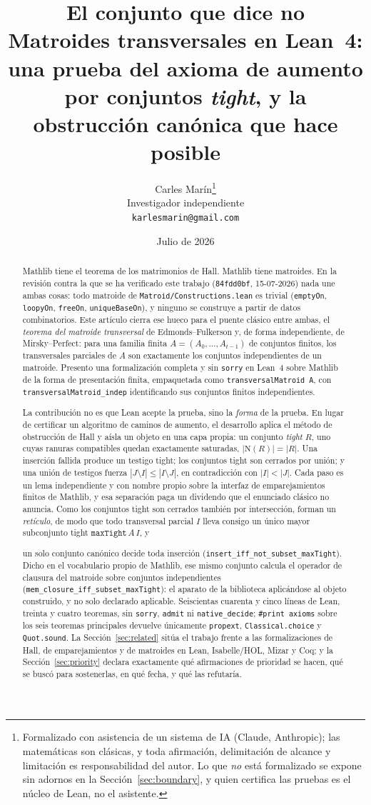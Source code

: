 \documentclass[11pt]{article}
\title{\bf El conjunto que dice no\\[4pt]
  \large\normalfont Matroides transversales en Lean~4: una prueba del axioma de aumento
  por conjuntos \emph{tight}, y la obstrucción canónica que hace posible}
\author{Carles Mar\'in\thanks{Formalizado con asistencia de un sistema de IA (Claude,
Anthropic); las matemáticas son clásicas, y toda afirmación, delimitación de alcance y
limitación es responsabilidad del autor. Lo que \emph{no} está formalizado se expone sin
adornos en la Sección~\ref{sec:boundary}, y quien certifica las pruebas es el núcleo de
Lean, no el asistente.}\\[3pt]
  \normalsize Investigador independiente\\
  \normalsize \texttt{karlesmarin@gmail.com}}
\date{Julio de 2026}
\newcommand{\lean}[1]{\texttt{#1}}
\newcommand{\N}{\mathrm{N}}
\newcommand{\keyeq}[1]{\begin{center}\keybox{$\displaystyle #1$}\end{center}}
\begin{document}
\maketitle

\begin{abstract}
Mathlib tiene el teorema de los matrimonios de Hall. Mathlib tiene matroides. En la revisión
contra la que se ha verificado este trabajo (\lean{84fdd0bf}, 15-07-2026) nada une ambas cosas:
todo matroide de \lean{Matroid/Constructions.lean} es trivial (\lean{emptyOn}, \lean{loopyOn},
\lean{freeOn}, \lean{uniqueBaseOn}), y ninguno se construye a partir de datos combinatorios. Este
artículo cierra ese hueco para el puente clásico entre ambas, el \emph{teorema del matroide
transversal} de Edmonds--Fulkerson y, de forma independiente, de Mirsky--Perfect: para una familia
finita $A=(A_0,\dots,A_{t-1})$ de conjuntos finitos, los transversales parciales de $A$ son
exactamente los conjuntos independientes de un matroide. Presento una formalización completa y sin
\lean{sorry} en Lean~4 sobre Mathlib de la forma de presentación finita, empaquetada como
\lean{transversalMatroid A}, con \lean{transversalMatroid\_indep} identificando sus conjuntos
finitos independientes.

La contribución no es que Lean acepte la prueba, sino la \emph{forma} de la prueba. En lugar de
certificar un algoritmo de caminos de aumento, el desarrollo aplica el método de obstrucción de
Hall y aísla un objeto en una capa propia: un conjunto \emph{tight} $R$, uno cuyas ranuras
compatibles quedan exactamente saturadas, $|\N(R)|=|R|$. Una inserción fallida produce un testigo
tight; los conjuntos tight son cerrados por unión; y una unión de testigos fuerza
$|J\setminus I|\le|I\setminus J|$, en contradicción con $|I|<|J|$. Cada paso es un lema
independiente y con nombre propio sobre la interfaz de emparejamientos finitos de Mathlib, y esa
separación paga un dividendo que el enunciado clásico no anuncia. Como los conjuntos tight son
cerrados también por intersección, forman un \emph{retículo}, de modo que todo transversal parcial
$I$ lleva consigo un único mayor subconjunto tight $\lean{maxTight}\,A\,I$, y
\keyeq{\lean{insert}\;e\;I \text{ es un transversal parcial} \iff \N(e)\not\subseteq \N(\lean{maxTight}\,A\,I),}
un solo conjunto canónico decide toda inserción (\lean{insert\_iff\_not\_subset\_maxTight}). Dicho
en el vocabulario propio de Mathlib, ese mismo conjunto calcula el operador de clausura del
matroide sobre conjuntos independientes (\lean{mem\_closure\_iff\_subset\_maxTight}): el aparato de
la biblioteca aplicándose al objeto construido, y no solo declarado aplicable. Seiscientas cuarenta
y cinco líneas de Lean, treinta y cuatro teoremas, sin \lean{sorry}, \lean{admit} ni
\lean{native\_decide}; \lean{\#print axioms} sobre los seis teoremas principales devuelve
únicamente \lean{propext}, \lean{Classical.choice} y \lean{Quot.sound}. La
Sección~\ref{sec:related} sitúa el trabajo frente a las formalizaciones de Hall, de
emparejamientos y de matroides en Lean, Isabelle/HOL, Mizar y Coq; y la
Sección~\ref{sec:priority} declara exactamente qué afirmaciones de prioridad se hacen, qué se
buscó para sostenerlas, en qué fecha, y qué las refutaría.
\end{abstract}
\end{document}
